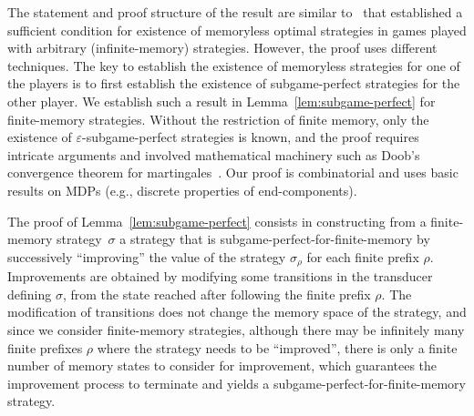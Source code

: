 \documentclass{article}
\let\epsilon\varepsilon
\newcommand{\straa}{\sigma}
\begin{document}
\smallskip{}
The statement and proof structure of the result are similar to~\cite[Theorem~5.2]{GK14}
that established a sufficient condition for existence of memoryless optimal strategies 
in games played with arbitrary (infinite-memory) strategies. 
However, the proof uses different techniques.  
The key to establish the existence of memoryless strategies for one of the 
players is to first establish the existence of subgame-perfect strategies
for the other player.
We establish such a result in Lemma~\ref{lem:subgame-perfect} for finite-memory
strategies. 
Without the restriction of finite memory, only the existence of $\epsilon$-subgame-perfect 
strategies is known, and the proof requires intricate arguments and involved mathematical
machinery such as Doob's convergence theorem for martingales~\cite[Theorem~4.1]{GK14}.
Our proof is combinatorial and uses basic results on MDPs (e.g., discrete properties of 
end-components).

\smallskip{}
The proof of Lemma~\ref{lem:subgame-perfect} consists in constructing from a finite-memory
strategy~$\straa$ a strategy that is subgame-perfect-for-finite-memory by successively ``improving'' 
the value of the strategy $\straa_\rho$ for each finite prefix $\rho$. 
Improvements are obtained by modifying some transitions in the transducer defining $\straa$,
from the state reached after following the finite prefix $\rho$. The modification
of transitions does not change the memory space of the strategy, and since we consider 
finite-memory strategies, although there may be infinitely many finite prefixes $\rho$
where the strategy needs to be ``improved'', there is only a finite number of memory states
to consider for improvement, which guarantees the improvement process to terminate
and yields a subgame-perfect-for-finite-memory strategy.
\end{document}
